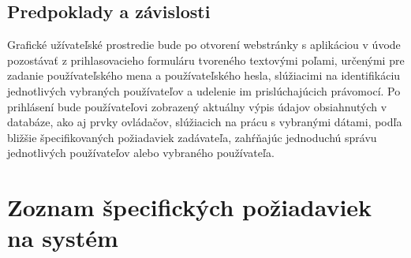 \documentclass[12pt,a4paper]{article}
\begin{document}
\subsection{Predpoklady a závislosti}
Grafické užívateľské prostredie bude po otvorení webstránky s aplikáciou v úvode pozostávať z prihlasovacieho formuláru tvoreného textovými poľami, určenými pre zadanie používateľského mena a používateľského hesla, slúžiacimi na identifikáciu jednotlivých vybraných používateľov a udelenie im prislúchajúcich právomocí. Po prihlásení bude používateľovi zobrazený aktuálny výpis údajov obsiahnutých v databáze, ako aj prvky ovládačov, slúžiacich 
na prácu s vybranými dátami, podľa bližšie špecifikovaných požiadaviek zadávateľa, zahŕňajúc jednoduchú správu jednotlivých používateľov alebo vybraného používateľa.

\section{Zoznam špecifických požiadaviek na systém}
\end{document}
